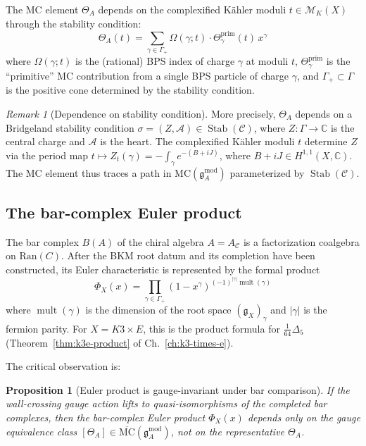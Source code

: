 \documentclass[11pt]{article}
\newtheorem{proposition}[theorem]{Proposition}
\theoremstyle{definition}
\theoremstyle{remark}
\newtheorem{remark}[theorem]{Remark}
\newcommand{\frakg}{\mathfrak{g}}
\newcommand{\MC}{\mathrm{MC}}
\newcommand{\Ran}{\mathrm{Ran}}
\newcommand{\cA}{\mathcal{A}}
\newcommand{\cC}{\mathcal{C}}
\newcommand{\cM}{\mathcal{M}}
\DeclareMathOperator{\mult}{mult}
\DeclareMathOperator{\Stab}{Stab}
\begin{document}
The MC element $\Theta_A$ depends on the complexified K\"ahler moduli
$t \in \cM_K(X)$ through the stability condition:
\begin{equation}\label{eq:theta-t-dependence}
 \Theta_A(t) = \sum_{\gamma \in \Gamma_+}
 \Omega(\gamma; t) \cdot \Theta_\gamma^{\mathrm{prim}}(t) \, x^\gamma
\end{equation}
where $\Omega(\gamma; t)$ is the (rational) BPS index of charge $\gamma$
at moduli $t$, $\Theta_\gamma^{\mathrm{prim}}$ is the ``primitive''
MC contribution from a single BPS particle of charge $\gamma$, and
$\Gamma_+ \subset \Gamma$ is the positive cone determined by the stability
condition.

\begin{remark}[Dependence on stability condition]\label{rem:stability}
More precisely, $\Theta_A$ depends on a Bridgeland stability condition
$\sigma = (Z, \cA) \in \Stab(\cC)$, where $Z \colon \Gamma \to \mathbb{C}$
is the central charge and $\cA$ is the heart. The complexified K\"ahler
moduli $t$ determine $Z$ via the period map $t \mapsto Z_t(\gamma) =
-\int_\gamma e^{-(B + iJ)}$, where $B + iJ \in H^{1,1}(X, \mathbb{C})$.
The MC element thus traces a path in $\MC(\frakg^{\mathrm{mod}}_A)$
parameterized by $\Stab(\cC)$.
\end{remark}

\subsection{The bar-complex Euler product}
\label{ssec:bar-euler}

The bar complex $B(A)$ of the chiral algebra $A = A_\cC$ is a
factorization coalgebra on $\Ran(C)$. After the BKM root datum and its
completion have been constructed, its Euler characteristic is represented
by the formal product
\begin{equation}\label{eq:euler-product}
 \Phi_X(x)
 = \prod_{\gamma \in \Gamma_+}
 (1 - x^\gamma)^{(-1)^{|\gamma|} \mult(\gamma)}
\end{equation}
where $\mult(\gamma)$ is the dimension of the root space
$(\frakg_X)_\gamma$ and $|\gamma|$ is the fermion parity. For
$X = K3 \times E$, this is the product formula for $\frac{1}{64}\Delta_5$
(Theorem~\ref*{thm:k3e-product} of Ch.~\ref*{ch:k3-times-e}).

The critical observation is:

\begin{proposition}[Euler product is gauge-invariant under bar comparison]
\label{prop:euler-gauge-inv}
If the wall-crossing gauge action lifts to quasi-isomorphisms of the
completed bar complexes, then the bar-complex Euler product $\Phi_X(x)$
depends only on the gauge equivalence class
$[\Theta_A] \in \overline{\MC}(\frakg^{\mathrm{mod}}_A)$, not on the
representative $\Theta_A$.
\end{proposition}
\end{document}
